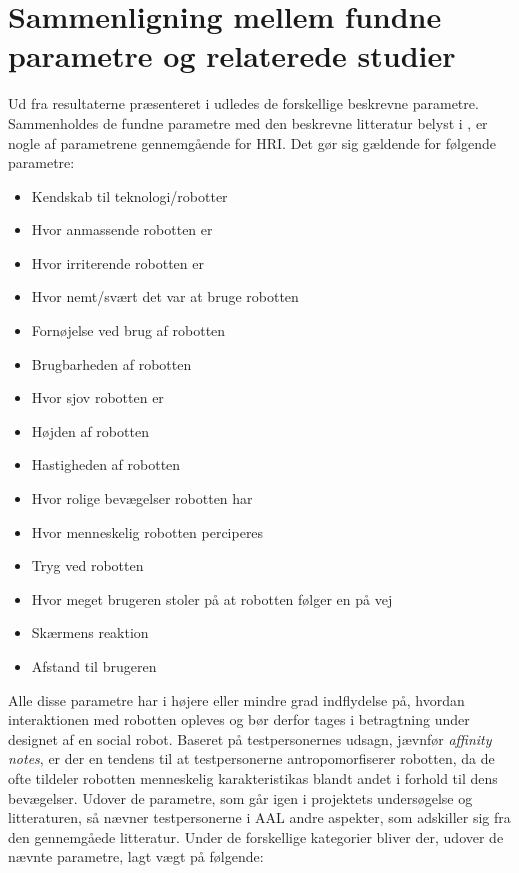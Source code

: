\section{Sammenligning mellem fundne parametre og relaterede studier}
\label{ParametreTidligereStudier}
%
Ud fra resultaterne præsenteret i  udledes de forskellige beskrevne parametre. Sammenholdes de fundne parametre med den beskrevne litteratur belyst i , er nogle af parametrene gennemgående for HRI. Det gør sig gældende for følgende parametre:
%
\begin{multicols}{2}
	\begin{itemize}
		\item Kendskab til teknologi/robotter
		\item Hvor anmassende robotten er
		\item Hvor irriterende robotten er
		\item Hvor nemt/svært det var at bruge robotten
		\item Fornøjelse ved brug af robotten
		\item Brugbarheden af robotten
		\item Hvor sjov robotten er
		\item Højden af robotten
		\item Hastigheden af robotten
		\item Hvor rolige bevægelser robotten har
		\item Hvor menneskelig robotten perciperes
		\item Tryg ved robotten
		\item Hvor meget brugeren stoler på at robotten følger en på vej
		\item Skærmens reaktion
		\item Afstand til brugeren
	\end{itemize}
\end{multicols}
\noindent
%
Alle disse parametre har i højere eller mindre grad indflydelse på, hvordan interaktionen med robotten opleves og bør derfor tages i betragtning under designet af en social robot. Baseret på testpersonernes udsagn, jævnfør \textit{affinity notes}, er der en tendens til at testpersonerne antropomorfiserer robotten, da de ofte tildeler robotten menneskelig karakteristikas blandt andet i forhold til dens bevægelser.\blankline
%
Udover de parametre, som går igen i projektets undersøgelse og litteraturen, så nævner testpersonerne i AAL andre aspekter, som adskiller sig fra den gennemgåede litteratur. Under de forskellige kategorier bliver der, udover de nævnte parametre, lagt vægt på følgende:
